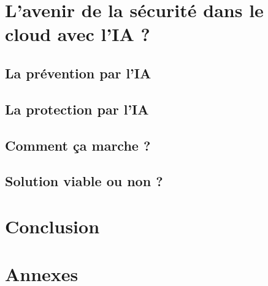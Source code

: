 \documentclass[a4paper, 12pt]{article}
\begin{document}
  \section{L'avenir de la sécurité dans le cloud avec l'IA ?}
    \subsection{La prévention par l'IA}
    \subsection{La protection par l'IA}
    \subsection{Comment ça marche ?}
    \subsection{Solution viable ou non ?}

  \section{Conclusion}

  \section{Annexes}
\end{document}
